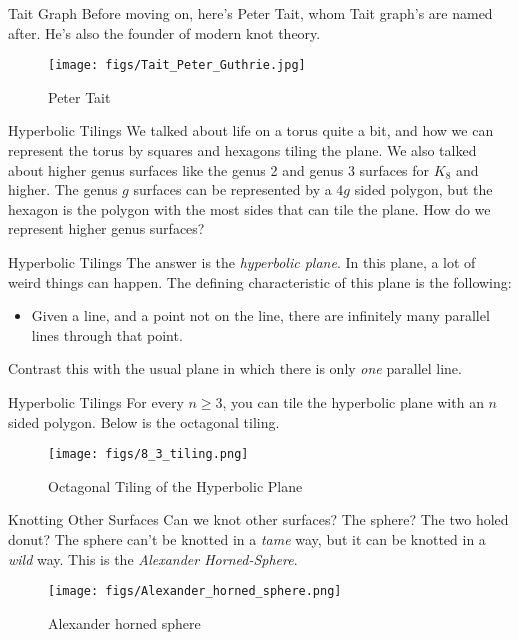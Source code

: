 \documentclass{beamer}
\begin{document}
    \begin{frame}{Tait Graph}
        Before moving on, here's Peter Tait, whom Tait graph's are named after.
        He's also the founder of modern knot theory.
        \begin{figure}
            \centering
            \texttt{[image: figs/Tait\_Peter\_Guthrie.jpg]}
            \caption{Peter Tait}
            \label{fig:Tait_Peter_Guthrie}
        \end{figure}
    \end{frame}
    \begin{frame}{Hyperbolic Tilings}
        We talked about life on a torus quite a bit, and how we
        can represent the torus by squares and hexagons tiling the plane.
        We also talked about higher genus surfaces like the genus 2 and
        genus 3 surfaces for $K_{8}$ and higher. The genus $g$ surfaces
        can be represented by a $4g$ sided polygon, but the hexagon is the
        polygon with the most sides that can tile the plane. How do we
        represent higher genus surfaces?
    \end{frame}
    \begin{frame}{Hyperbolic Tilings}
        The answer is the \textit{hyperbolic plane}. In this plane, a
        lot of weird things can happen. The defining characteristic of this
        plane is the following:
        \begin{itemize}
            \item Given a line, and a point not on the line, there are
                infinitely many parallel lines through that point.
        \end{itemize}
        Contrast this with the usual plane in which there is only
        \textit{one} parallel line.
    \end{frame}
    \begin{frame}{Hyperbolic Tilings}
        For every $n\geq{3}$, you can tile the hyperbolic plane
        with an $n$ sided polygon. Below is the octagonal tiling.
        \begin{figure}
            \centering
            \texttt{[image: figs/8\_3\_tiling.png]}
            \caption{Octagonal Tiling of the Hyperbolic Plane}
            \label{fig:8_3_tiling}
        \end{figure}
    \end{frame}
    \begin{frame}{Knotting Other Surfaces}
        Can we knot other surfaces? The sphere? The
        two holed donut? The sphere can't be knotted
        in a \textit{tame} way, but it can be knotted in a
        \textit{wild} way. This is the \textit{Alexander Horned-Sphere}.
        \begin{figure}
            \centering
            \texttt{[image: figs/Alexander\_horned\_sphere.png]}
            \caption{Alexander horned sphere}
            \label{fig:Alexander_horned_sphere}
        \end{figure}
    \end{frame}
\end{document}
